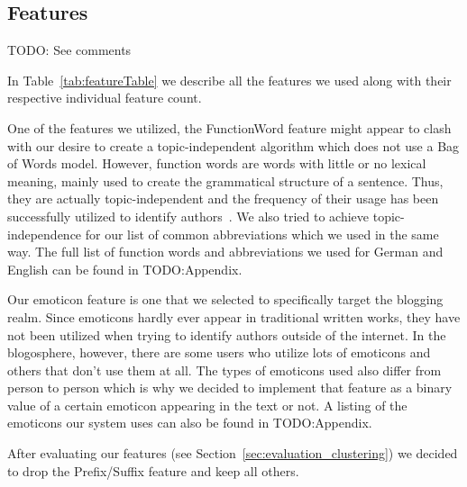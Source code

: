 \subsection{Features}
\label{sec:impl_features}

TODO: See comments

In Table~\ref{tab:featureTable} we describe all the features we used along with their respective individual feature count.


One of the features we utilized, the FunctionWord feature might appear to clash with our desire to create a topic-independent algorithm which does not use a Bag of Words model.
However, function words are words with little or no lexical meaning, mainly used to create the grammatical structure of a sentence.
Thus, they are actually topic-independent and the frequency of their usage has been successfully utilized to identify authors~\cite{mosteller1962applied}.
We also tried to achieve topic-independence for our list of common abbreviations which we used in the same way.
The full list of function words and abbreviations we used for German and English can be found in TODO:Appendix.


Our emoticon feature is one that we selected to specifically target the blogging realm.
Since emoticons hardly ever appear in traditional written works, they have not been utilized when trying to identify authors outside of the internet.
In the blogosphere, however, there are some users who utilize lots of emoticons and others that don't use them at all.
The types of emoticons used also differ from person to person which is why we decided to implement that feature as a binary value of a certain emoticon appearing in the text or not.
A listing of the emoticons our system uses can also be found in TODO:Appendix.


After evaluating our features (see Section~\ref{sec:evaluation_clustering}) we decided to drop the Prefix/Suffix feature and keep all others.

